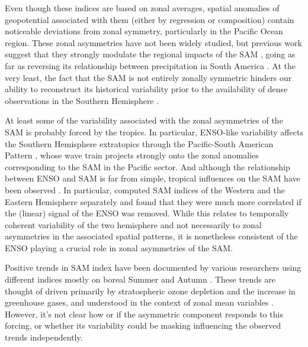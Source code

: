 \documentclass[]{ametsocV5}
\begin{document}
Even though these indices are based on zonal averages, spatial anomalies of geopotential associated with them (either by regression or composition) contain noticeable deviations from zonal symmetry, particularly in the Pacific Ocean region. These zonal asymmetries have not been widely studied, but previous work suggest that they strongly modulate the regional impacts of the SAM \citep{fan2007, fogt2012, rosso2018}, going as far as reversing its relationship between precipitation in South America \citep{silvestri2009}. At the very least, the fact that the SAM is not entirely zonally symmetric hinders our ability to reconstruct its historical variability prior to the availability of dense observations in the Southern Hemisphere \citep{jones2009}.

At least some of the variability associated with the zonal asymmetries of the SAM is probably forced by the tropics. In particular, ENSO-like variability affects the Southern Hemisphere extratopics through the Pacific-South American Pattern \citep{mo1987, kidson1988, karoly1989}, whose wave train projects strongly onto the zonal anomalies corresponding to the SAM in the Pacific sector. And although the relationship between ENSO and SAM is far from simple, tropical influences on the SAM have been observed \citep{fan2007, fogt2011, clem2013}. In particular, \citet{fan2007} computed SAM indices of the Western and the Eastern Hemisphere separately and found that they were much more correlated if the (linear) signal of the ENSO was removed. While this relates to temporally coherent variability of the two hemisphere and not necessarily to zonal asymmetries in the associated spatial patterns, it is nonetheless consistent of the ENSO playing a crucial role in zonal asymmetries of the SAM.

Positive trends in SAM index have been documented by various researchers using different indices mostly on boreal Summer and Autumn \citep[e.g.][ and references therein]{fogt2020}. These trends are thought of driven primarily by stratospheric ozone depletion and the increase in greenhouse gases, and understood in the context of zonal mean variables \citep{marshall2004, gillett2005, arblaster2006, gillett2013}. However, it's not clear how or if the asymmetric component responds to this forcing, or whether its variability could be masking influencing the observed trends independently.
\end{document}
